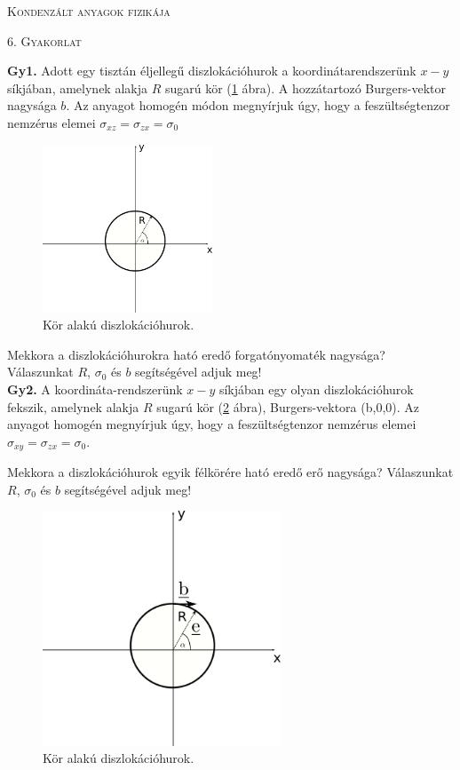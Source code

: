 \documentclass[12pt]{article}
\begin{document}
\centerline{
\textsc{\Large{ Kondenzált anyagok fizikája}}
}
\centerline{ 
\textsc{\large{6. Gyakorlat}}
}
\vspace{10mm}

\textbf{Gy1.} Adott egy tisztán éljellegű diszlokációhurok a koordinátarendszerünk $x-y$ síkjában, amelynek alakja $R$ sugarú kör (\ref{korabra} ábra). A hozzátartozó Burgers-vektor nagysága $b$. Az anyagot homogén módon megnyírjuk úgy, hogy a feszültségtenzor nemzérus elemei $\sigma_{xz} = \sigma_{zx} = \sigma_0$

\begin{figure}[h!]
\begin{center}
\includegraphics[height=5cm]{../images/6diszlokkor.png}
\caption{ Kör alakú diszlokációhurok.}
 \label{korabra}
 \end{center}
\end{figure}

Mekkora a diszlokációhurokra ható eredő forgatónyomaték nagysága? Válaszunkat $R$, $\sigma_0$ és $b$ segítségével adjuk meg!
\\

\textbf{Gy2.}  A koordináta-rendszerünk $x-y$ síkjában egy olyan  diszlokációhurok  fekszik, amelynek alakja $R$ sugarú kör (\ref{korabra2} ábra), Burgers-vektora (b,0,0). Az anyagot homogén megnyírjuk úgy, hogy  a feszültségtenzor nemzérus elemei $\sigma_{xy} = \sigma_{zx} = \sigma_0$.

Mekkora a diszlokációhurok egyik félkörére ható eredő erő nagysága?
Válaszunkat$R$, $\sigma_0$ és $b$ segítségével adjuk meg!
\begin{figure}[h!]
\begin{center}
\includegraphics[height=7cm]{../images/6diszlokkor2.png}
\caption{ Kör alakú diszlokációhurok.}
 \label{korabra2}
 \end{center}
\end{figure}
\end{document}

